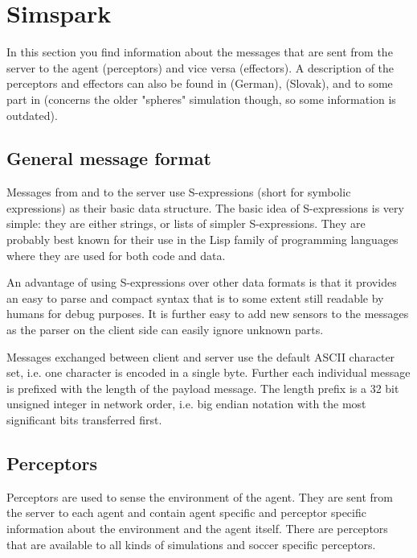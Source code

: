 \chapter{Simspark}
\label{cha:simspark}

In this section you find information about the messages that are sent from the
server to the agent (perceptors) and vice versa (effectors). A description of
the perceptors and effectors can also be found in \cite{SchillingJ} (German), \cite{Lekavy} (Slovak), and to some part in \cite{Vorst06} (concerns the older "spheres" simulation though, so some information is outdated).





\section{General message format}
\label{sec:msgformat}
Messages from and to the server use S-expressions (short for symbolic
expressions) as their basic data structure. The basic idea of
S-expressions is very simple: they are either strings, or lists of
simpler S-expressions.  They are probably best known for their use in
the Lisp family of programming languages where they are used for both
code and data.

An advantage of using S-expressions over other data formats is that it
provides an easy to parse and compact syntax that is to some extent
still readable by humans for debug purposes. It is further easy to add
new sensors to the messages as the parser on the client side can
easily ignore unknown parts.

Messages exchanged between client and server use the default ASCII
character set, i.e. one character is encoded in a single byte. Further
each individual message is prefixed with the length of the payload
message. The length prefix is a 32 bit unsigned integer in network
order, i.e. big endian notation with the most significant bits
transferred first.





\section{Perceptors}
\label{sec:perceptors}
Perceptors are used to sense the environment of the agent. They are sent from
the server to each agent and contain agent specific and perceptor specific
information about the environment and the agent itself. There are perceptors
that are available to all kinds of simulations and soccer specific perceptors.

